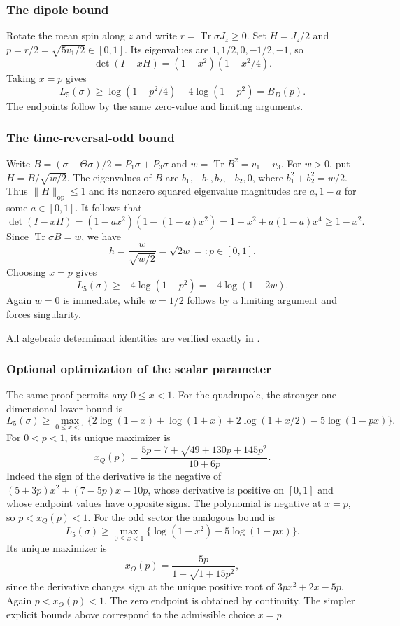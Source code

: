 \documentclass[11pt,a4paper]{article}
\newcommand{\Tr}{\operatorname{Tr}}
\begin{document}
\subsubsection{The dipole bound}
Rotate the mean spin along $z$ and write $r=\Tr\sigma J_z\ge0$.
Set $H=J_z/2$ and $p=r/2=\sqrt{5v_1/2}\in[0,1]$.
Its eigenvalues are $1,1/2,0,-1/2,-1$, so
\[
\det(I-xH)=(1-x^2)(1-x^2/4).
\]
Taking $x=p$ gives
\[
L_5(\sigma)\ge\log(1-p^2/4)-4\log(1-p^2)=B_D(p).
\]
The endpoints follow by the same zero-value and limiting arguments.

\subsubsection{The time-reversal-odd bound}
Write $B=(\sigma-\Theta\sigma)/2=P_1\sigma+P_3\sigma$ and
$w=\Tr B^2=v_1+v_3$. For $w>0$, put $H=B/\sqrt{w/2}$.
The eigenvalues of $B$ are $b_1,-b_1,b_2,-b_2,0$, where
$b_1^2+b_2^2=w/2$. Thus $\|H\|_{\mathrm{op}}\le1$ and its nonzero
squared eigenvalue magnitudes are $a,1-a$ for some $a\in[0,1]$.
It follows that
\[
\det(I-xH)=(1-ax^2)(1-(1-a)x^2)
=1-x^2+a(1-a)x^4\ge1-x^2.
\]
Since $\Tr\sigma B=w$, we have
\[
h=\frac w{\sqrt{w/2}}=\sqrt{2w}=:p\in[0,1].
\]
Choosing $x=p$ gives
\[
L_5(\sigma)\ge-4\log(1-p^2)=-4\log(1-2w).
\]
Again $w=0$ is immediate, while $w=1/2$ follows by a limiting argument
and forces singularity.

All algebraic determinant identities are verified exactly in
.

\subsubsection{Optional optimization of the scalar parameter}
The same proof permits any $0\le x<1$. For the quadrupole, the stronger
one-dimensional lower bound is
\[
L_5(\sigma)\ge\max_{0\le x<1}
\{2\log(1-x)+\log(1+x)+2\log(1+x/2)-5\log(1-px)\}.
\]
For $0<p<1$, its unique maximizer is
\[
x_Q(p)=\frac{5p-7+\sqrt{49+130p+145p^2}}{10+6p}.
\]
Indeed the sign of the derivative is the negative of
$(5+3p)x^2+(7-5p)x-10p$, whose derivative is positive on $[0,1]$
and whose endpoint values have opposite signs. The polynomial is negative
at $x=p$, so $p<x_Q(p)<1$.
For the odd sector the analogous bound is
\[
L_5(\sigma)\ge\max_{0\le x<1}
\{\log(1-x^2)-5\log(1-px)\}.
\]
Its unique maximizer is
\[
x_O(p)=\frac{5p}{1+\sqrt{1+15p^2}},
\]
since the derivative changes sign at the unique positive root of
$3px^2+2x-5p$. Again $p<x_O(p)<1$.
The zero endpoint is obtained by continuity. The simpler explicit bounds
above correspond to the admissible choice $x=p$.
\end{document}
